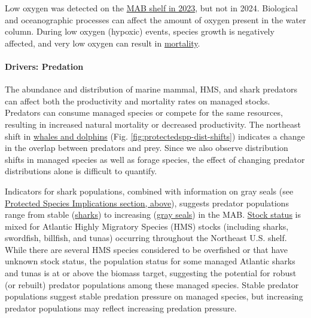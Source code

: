 \documentclass[
  10pt,
]{article}
\begin{document}
Low oxygen was detected on the \href{https://noaa-edab.github.io/catalog/observation_synthesis_2023.html}{MAB shelf in 2023}, but not in 2024. Biological and oceanographic processes can affect the amount of oxygen present in the water column. During low oxygen (hypoxic) events, species growth is negatively affected, and very low oxygen can result in \href{https://sebsnjaesnews.rutgers.edu/2023/12/rutgers-scientists-observe-unusual-ocean-conditions-possibly-linked-to-mortality-in-marine-life-off-new-jersey/}{mortality}.

\hypertarget{drivers-predation}{%
\paragraph{Drivers: Predation}\label{drivers-predation}}

The abundance and distribution of marine mammal, HMS, and shark predators can affect both the productivity and mortality rates on managed stocks. Predators can consume managed species or compete for the same resources, resulting in increased natural mortality or decreased productivity. The northeast shift in \href{https://noaa-edab.github.io/catalog/cetacean_dist.html}{whales and dolphins} (Fig. \ref{fig:protectedspp-dist-shifts}) indicates a change in the overlap between predators and prey. Since we also observe distribution shifts in managed species as well as forage species, the effect of changing predator distributions alone is difficult to quantify.

Indicators for shark populations, combined with information on gray seals (see \protect\hyperlink{protected-species}{Protected Species Implications section, above}), suggests predator populations range from stable (\href{https://noaa-edab.github.io/catalog/hms_cpue.html}{sharks}) to increasing (\href{https://noaa-edab.github.io/catalog/seal_pups.html}{gray seals}) in the MAB. \href{https://noaa-edab.github.io/catalog/hms_stock_status.html}{Stock status} is mixed for Atlantic Highly Migratory Species (HMS) stocks (including sharks, swordfish, billfish, and tunas) occurring throughout the Northeast U.S. shelf. While there are several HMS species considered to be overfished or that have unknown stock status, the population status for some managed Atlantic sharks and tunas is at or above the biomass target, suggesting the potential for robust (or rebuilt) predator populations among these managed species. Stable predator populations suggest stable predation pressure on managed species, but increasing predator populations may reflect increasing predation pressure.
\end{document}

